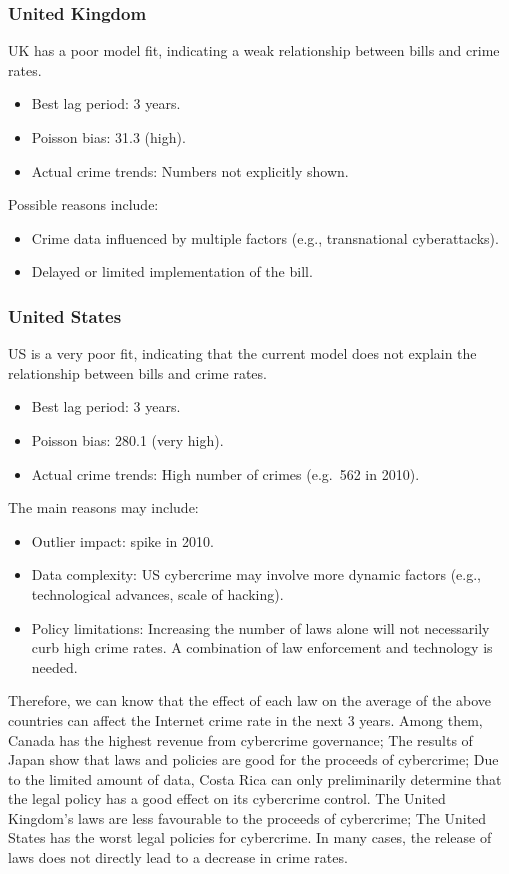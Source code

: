     \subsubsection*{United Kingdom} %
        UK has a poor model fit, indicating a weak relationship between bills and crime rates.
        \begin{itemize}
            \item Best lag period: 3 years.
            \item Poisson bias: 31.3 (high).
            \item Actual crime trends: Numbers not explicitly shown.
        \end{itemize}
        Possible reasons include:
        \begin{itemize}
            \item Crime data influenced by multiple factors (e.g., transnational cyberattacks).
            \item Delayed or limited implementation of the bill.
        \end{itemize}
    \subsubsection*{United States} %
        US is a very poor fit,
        indicating that the current model does not explain the relationship between bills and crime rates.
        \begin{itemize}
            \item Best lag period: 3 years.
            \item Poisson bias: 280.1 (very high).
            \item Actual crime trends: High number of crimes (e.g.\ 562 in 2010).
        \end{itemize}
        The main reasons may include:
        \begin{itemize}
            \item Outlier impact: spike in 2010.
            \item Data complexity: US cybercrime may involve more dynamic factors
                (e.g., technological advances, scale of hacking).
            \item Policy limitations: Increasing the number of laws alone will not necessarily curb high crime rates.
                A combination of law enforcement and technology is needed.
        \end{itemize}

        Therefore, we can know that the effect of each law on the average of the above countries
        can affect the Internet crime rate in the next 3 years.
        Among them, Canada has the highest revenue from cybercrime governance;
        The results of Japan show that laws and policies are good for the proceeds of cybercrime;
        Due to the limited amount of data,
        Costa Rica can only preliminarily determine that the legal policy has a good effect on its cybercrime control.
        The United Kingdom's laws are less favourable to the proceeds of cybercrime;
        The United States has the worst legal policies for cybercrime.
        In many cases, the release of laws does not directly lead to a decrease in crime rates.
